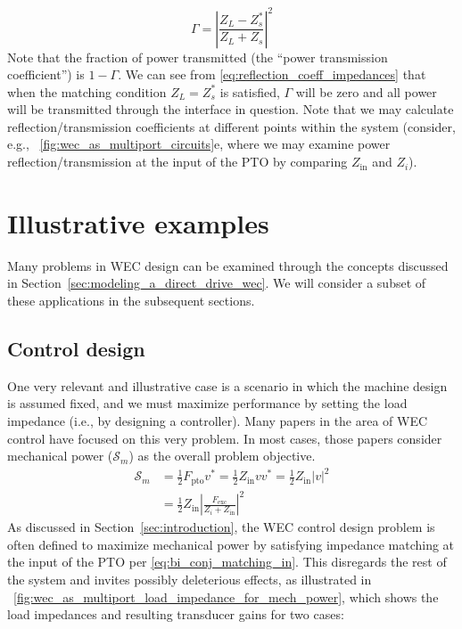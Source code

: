\documentclass[twocolumn]{autart}
\begin{document}
%
\begin{equation}
        \Gamma =\left| \frac{Z_L - Z_s^*}{Z_L + Z_s} \right|^2
        \label{eq:reflection_coeff_impedances}
\end{equation}
%
Note that the fraction of power transmitted (the ``power transmission coefficient'') is $1 - \Gamma$.
We can see from \eqref{eq:reflection_coeff_impedances} that when the matching condition $Z_L = Z_s^*$ is satisfied, $\Gamma$ will be zero and all power will be transmitted through the interface in question.
Note that we may calculate reflection/transmission coefficients at different points within the system (consider, e.g., \figurename~\ref{fig:wec_as_multiport_circuits}e, where we may examine power reflection/transmission at the input of the PTO by comparing $Z_{\textrm{in}}$ and $Z_i$).

\section{Illustrative examples}\label{sec:illustrative_examples}
Many problems in WEC design can be examined through the concepts discussed in Section~\ref{sec:modeling_a_direct_drive_wec}.
We will consider a subset of these applications in the subsequent sections.%

\subsection{Control design}\label{sec:control_design}
One very relevant and illustrative case is a scenario in which the machine design is assumed fixed, and we must maximize performance by setting the load impedance (i.e., by designing a controller).
Many papers in the area of WEC control have focused on this very problem.
In most cases, those papers consider mechanical power ($\mathcal{S}_{m}$) as the overall problem objective.
%
\begin{equation}
\begin{aligned}
        \mathcal{S}_{m}  &= \frac{1}{2} F_{\textrm{pto}} v^*  = \frac{1}{2}Z_{\textrm{in}} v v^* = \frac{1}{2}Z_{\textrm{in}} | v |^2 \\
        &= \frac{1}{2} Z_{\textrm{in}} \left| \frac{F_{\textrm{exc}}}{Z_i + Z_{\textrm{in}}} \right|^2
\end{aligned}
\end{equation}
%
As discussed in Section~\ref{sec:introduction}, the WEC control design problem is often defined to maximize mechanical power by satisfying impedance matching at the input of the PTO per \eqref{eq:bi_conj_matching_in}.
This disregards the rest of the system and invites possibly deleterious effects, as illustrated in \figurename~\ref{fig:wec_as_multiport_load_impedance_for_mech_power}, which shows the load impedances and resulting transducer gains for two cases:
\end{document}
